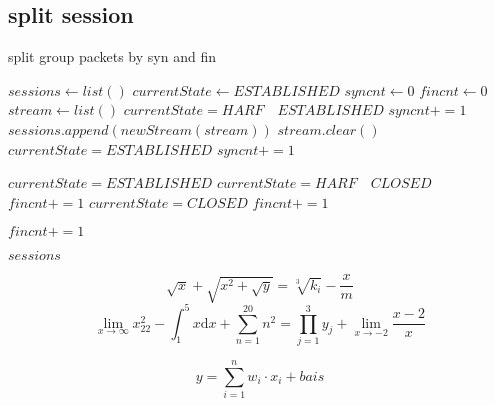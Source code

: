\documentclass[preprint,12pt]{elsarticle}
\begin{document}
    \subsection{split session}
        \begin{algorithm}
            \caption{split group packets by syn and fin}
            \begin{algorithmic}[1]
                    \State $ sessions \gets list() $
                    \State $ currentState \gets ESTABLISHED $
                    \State $ syncnt \gets 0 $
                    \State $ fincnt \gets 0 $
                    \State $ stream \gets list() $
                                \State $ currentState = HARF \quad ESTABLISHED$
                                \State $ syncnt += 1 $
                                \State $ sessions.append(new Stream(stream)) $
                                \State $ stream.clear() $
                                \State $ currentState = ESTABLISHED $
                                \State $ syncnt += 1$

                            \Else
                                \State $ currentState = ESTABLISHED $
                            \EndIf
                        \EndIf
                                \State $ currentState = HARF \quad CLOSED $
                                \State $ fincnt += 1 $
                                \State $ currentState = CLOSED $
                                \State $ fincnt += 1 $

                            \Else
                                \State $ fincnt += 1 $
                            \EndIf
                        \EndIf
                     \EndFor

                  \State \Return $ sessions $
                \EndFunction
            \end{algorithmic}
        \end{algorithm}
    $$ \sqrt{x} + \sqrt{x^{2}+\sqrt{y}} = \sqrt[3]{k_{i}} - \frac{x}{m} $$
    $$  \lim_{x \to \infty} x^2_{22} - \int_{1}^{5}x\mathrm{d}x + \sum_{n=1}^{20} n^{2} = \prod_{j=1}^{3} y_{j}  + \lim_{x \to -2} \frac{x-2}{x}  $$

    \begin{equation}
         y =  \sum_{i=1}^{n} w_i \cdot x_i + bais \tag{5.1.1}
    \end{equation}
\end{document}
